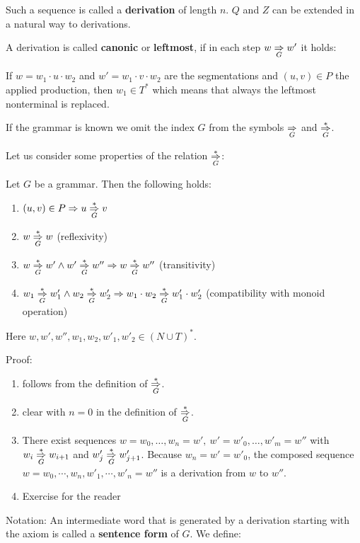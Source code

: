 Such a sequence is called a {\bf derivation} of length $n$. $Q$ and $Z$ can be
extended in a natural way to derivations.

A derivation is called {\bf canonic} or {\bf leftmost}, if in each step $w
\underset{G}{\Rightarrow} w'$ it holds:

If $w = w_1 \cdot u \cdot w_2$ and $w' = w_1 \cdot v \cdot w_2$ are the
segmentations and $(u, v) \in P$ the applied production, then $w_1 \in T^*$
which means that always the leftmost nonterminal is replaced.

If the grammar is known we omit the index $G$ from the symbols $\underset{G}{\Rightarrow}$
and $\underset{G}{\overset{*}{\Rightarrow}}$.

Let us consider some properties of the relation $\underset{G}{\overset{*}{\Rightarrow}}$:

\begin{lemma}
Let $G$ be a grammar. Then the following holds:
\begin{enumerate}
  \item $(u, v) \in P \Rightarrow u \underset{G}{\overset{*}{\Rightarrow}} v$
  \item $w \underset{G}{\overset{*}{\Rightarrow}} w$ (reflexivity)
  \item $w \underset{G}{\overset{*}{\Rightarrow}} w' \wedge w' \underset{G}{\overset{*}{\Rightarrow}} w'' \Rightarrow w \underset{G}{\overset{*}{\Rightarrow}}
  w''$ (transitivity)
  \item $w_1 \underset{G}{\overset{*}{\Rightarrow}} w'_1 \wedge w_2 \underset{G}{\overset{*}{\Rightarrow}} w'_2 \Rightarrow w_1 \cdot
  w_2 \underset{G}{\overset{*}{\Rightarrow}} w'_1 \cdot w'_2$ (compatibility with monoid operation)
\end{enumerate}
Here $w, w', w'', w_1, w_2, w'_1, w'_2 \in (N \cup T)^*$.
\end{lemma}

Proof:
\begin{enumerate}
  \item follows from the definition of $\underset{G}{\overset{*}{\Rightarrow}}$.
  \item clear with $n = 0$ in the definition of $\underset{G}{\overset{*}{\Rightarrow}}$.
  \item There exist sequences $w = w_0, \ldots, w_n = w',\ w' = w'_0, \ldots,
  w'_m = w''$ with $w_i \underset{G}{\overset{*}{\Rightarrow}} w_{i+1}$ and $w'_j \underset{G}{\overset{*}{\Rightarrow}} w'_{j+1}$.
  Because $w_n = w' = w'_0$, the composed sequence $w = w_0, \cdots, w_n, w'_1,
  \cdots, w'_n = w''$ is a derivation from $w$ to $w''$.
  \item Exercise for the reader
\end{enumerate}

Notation: An intermediate word that is generated by a derivation starting with
the axiom is called a {\bf sentence form} of $G$. We define:

